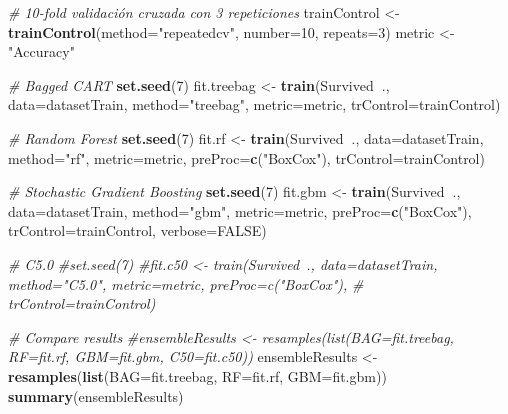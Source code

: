 \documentclass[]{article}
\newenvironment{Shaded}{\begin{snugshade}}{\end{snugshade}}
\newcommand{\KeywordTok}[1]{\textcolor[rgb]{0.13,0.29,0.53}{\textbf{#1}}}
\newcommand{\DataTypeTok}[1]{\textcolor[rgb]{0.13,0.29,0.53}{#1}}
\newcommand{\DecValTok}[1]{\textcolor[rgb]{0.00,0.00,0.81}{#1}}
\newcommand{\StringTok}[1]{\textcolor[rgb]{0.31,0.60,0.02}{#1}}
\newcommand{\CommentTok}[1]{\textcolor[rgb]{0.56,0.35,0.01}{\textit{#1}}}
\newcommand{\OtherTok}[1]{\textcolor[rgb]{0.56,0.35,0.01}{#1}}
\newcommand{\OperatorTok}[1]{\textcolor[rgb]{0.81,0.36,0.00}{\textbf{#1}}}
\newcommand{\NormalTok}[1]{#1}
\begin{document}
\begin{Shaded}
\begin{Highlighting}[]
\CommentTok{# 10-fold validación cruzada con 3 repeticiones}
\NormalTok{trainControl <-}\StringTok{ }\KeywordTok{trainControl}\NormalTok{(}\DataTypeTok{method=}\StringTok{"repeatedcv"}\NormalTok{, }\DataTypeTok{number=}\DecValTok{10}\NormalTok{, }\DataTypeTok{repeats=}\DecValTok{3}\NormalTok{)}
\NormalTok{metric <-}\StringTok{ "Accuracy"}

\CommentTok{# Bagged CART}
\KeywordTok{set.seed}\NormalTok{(}\DecValTok{7}\NormalTok{)}
\NormalTok{fit.treebag <-}\StringTok{ }\KeywordTok{train}\NormalTok{(Survived}\OperatorTok{~}\NormalTok{., }\DataTypeTok{data=}\NormalTok{datasetTrain, }\DataTypeTok{method=}\StringTok{"treebag"}\NormalTok{, }\DataTypeTok{metric=}\NormalTok{metric,}
    \DataTypeTok{trControl=}\NormalTok{trainControl)}

\CommentTok{# Random Forest}
\KeywordTok{set.seed}\NormalTok{(}\DecValTok{7}\NormalTok{)}
\NormalTok{fit.rf <-}\StringTok{ }\KeywordTok{train}\NormalTok{(Survived}\OperatorTok{~}\NormalTok{., }\DataTypeTok{data=}\NormalTok{datasetTrain, }\DataTypeTok{method=}\StringTok{"rf"}\NormalTok{, }\DataTypeTok{metric=}\NormalTok{metric, }\DataTypeTok{preProc=}\KeywordTok{c}\NormalTok{(}\StringTok{"BoxCox"}\NormalTok{),}
    \DataTypeTok{trControl=}\NormalTok{trainControl)}

\CommentTok{# Stochastic Gradient Boosting}
\KeywordTok{set.seed}\NormalTok{(}\DecValTok{7}\NormalTok{)}
\NormalTok{fit.gbm <-}\StringTok{ }\KeywordTok{train}\NormalTok{(Survived}\OperatorTok{~}\NormalTok{., }\DataTypeTok{data=}\NormalTok{datasetTrain, }\DataTypeTok{method=}\StringTok{"gbm"}\NormalTok{, }\DataTypeTok{metric=}\NormalTok{metric, }\DataTypeTok{preProc=}\KeywordTok{c}\NormalTok{(}\StringTok{"BoxCox"}\NormalTok{),}
    \DataTypeTok{trControl=}\NormalTok{trainControl, }\DataTypeTok{verbose=}\OtherTok{FALSE}\NormalTok{)}

\CommentTok{# C5.0}
\CommentTok{#set.seed(7)}
\CommentTok{#fit.c50 <- train(Survived~., data=datasetTrain, method="C5.0", metric=metric, preProc=c("BoxCox"),}
\CommentTok{#    trControl=trainControl)}

\CommentTok{# Compare results}
\CommentTok{#ensembleResults <- resamples(list(BAG=fit.treebag, RF=fit.rf, GBM=fit.gbm, C50=fit.c50))}
\NormalTok{ensembleResults <-}\StringTok{ }\KeywordTok{resamples}\NormalTok{(}\KeywordTok{list}\NormalTok{(}\DataTypeTok{BAG=}\NormalTok{fit.treebag, }\DataTypeTok{RF=}\NormalTok{fit.rf, }\DataTypeTok{GBM=}\NormalTok{fit.gbm))}
\KeywordTok{summary}\NormalTok{(ensembleResults)}
\end{Highlighting}
\end{Shaded}
\end{document}
